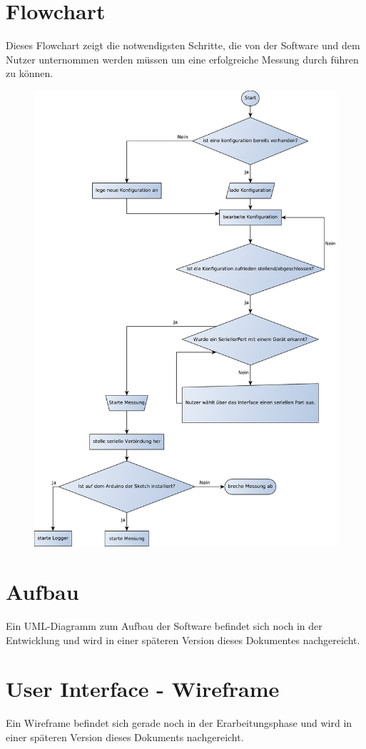 \section{Flowchart}
Dieses Flowchart zeigt die notwendigsten Schritte, die von der Software und dem Nutzer unternommen werden müssen um eine erfolgreiche Messung durch führen zu können. 
\begin{figure}[H]
 \centering
 \includegraphics[width=\textwidth, keepaspectratio=true]{../Diagramme/SoftwareFlowChart.pdf}
\end{figure}
\section{Aufbau}
Ein UML-Diagramm zum Aufbau der Software befindet sich noch in der Entwicklung und wird in einer späteren Version dieses Dokumentes nachgereicht.
\section{User Interface - Wireframe}
Ein Wireframe befindet sich gerade noch in der Erarbeitungsphase und wird in einer späteren Version dieses Dokuments nachgereicht.